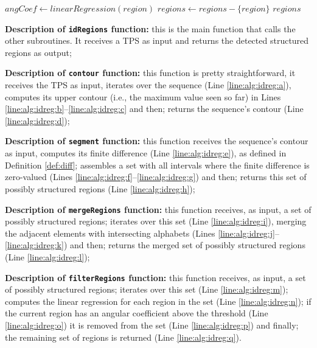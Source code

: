 \documentclass{vldb}
\begin{document}
\begin{algorithm}
\begin{algorithmic}[1]

 
\label{line:alg:idreg:m}
\State $angCoef \leftarrow linearRegression(region)$\label{line:alg:idreg:n}
\label{line:alg:idreg:o}
\State $regions \leftarrow regions - \{region\}$\label{line:alg:idreg:p}
\EndIf
\EndFor
\State \Return $regions$\label{line:alg:idreg:q}
\EndFunction

\end{algorithmic}
\end{algorithm}

\textbf{Description of \texttt{idRegions} function:} this is the main function
that calls the other subroutines. It receives a TPS as input and returns the
detected structured regions as output;

\textbf{Description of \texttt{contour} function:} this function is
pretty straightforward, it receives the TPS as input, iterates over the sequence (Line
\ref{line:alg:idreg:a}), computes its upper contour (i.e., the maximum value
seen so far) in Lines \ref{line:alg:idreg:b}--\ref{line:alg:idreg:c} and then;
returns the sequence's contour (Line \ref{line:alg:idreg:d});

\textbf{Description of \texttt{segment} function:} this function receives the
sequence's contour as input, computes its finite difference (Line
\ref{line:alg:idreg:e}), as defined in Definition \ref{def:diff};
assembles a set with all intervals where the finite difference is zero-valued
(Lines \ref{line:alg:idreg:f}--\ref{line:alg:idreg:g}) and then; returns this
set of possibly structured regions (Line \ref{line:alg:idreg:h});

\textbf{Description of \texttt{mergeRegions} function:} this function
receives, as input, a set of possibly structured regions; iterates over this set (Line
\ref{line:alg:idreg:i}), merging the adjacent elements with intersecting alphabets (Lines
\ref{line:alg:idreg:j}--\ref{line:alg:idreg:k}) and then; returns the merged set
of possibly structured regions (Line \ref{line:alg:idreg:l});

\textbf{Description of \texttt{filterRegions} function:} this function
receives, as input, a set of possibly structured regions; iterates over this set (Line
\ref{line:alg:idreg:m}); computes the linear regression for each region in the
set (Line \ref{line:alg:idreg:n}); if the current region has an angular
coefficient above the threshold (Line \ref{line:alg:idreg:o}) it is removed from the set
(Line \ref{line:alg:idreg:p}) and finally; the remaining set of regions is
returned (Line \ref{line:alg:idreg:q}).
\end{document}
